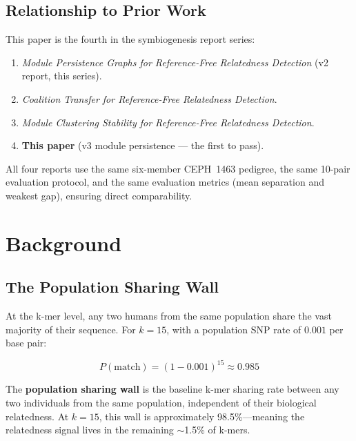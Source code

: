 \documentclass{../yalumba}
\begin{document}
\subsection{Relationship to Prior Work}

This paper is the fourth in the symbiogenesis report series:

\begin{enumerate}
  \item \emph{Module Persistence Graphs for Reference-Free Relatedness
        Detection} (v2 report, this series).
  \item \emph{Coalition Transfer for Reference-Free Relatedness Detection}.
  \item \emph{Module Clustering Stability for Reference-Free Relatedness
        Detection}.
  \item \textbf{This paper} (v3 module persistence --- the first to pass).
\end{enumerate}

\noindent All four reports use the same six-member CEPH~1463 pedigree, the
same 10-pair evaluation protocol, and the same evaluation metrics (mean
separation and weakest gap), ensuring direct comparability.


\section{Background}
\label{sec:background}

\subsection{The Population Sharing Wall}

At the k-mer level, any two humans from the same population share the vast
majority of their sequence.  For $k = 15$, with a population SNP rate of
$0.001$ per base pair:

\begin{equation}
  P(\text{match}) = (1 - 0.001)^{15} \approx 0.985
  \label{eq:sharing-wall}
\end{equation}

\begin{definition}
The \textbf{population sharing wall} is the baseline k-mer sharing rate between
any two individuals from the same population, independent of their biological
relatedness.  At $k = 15$, this wall is approximately 98.5\%---meaning the
relatedness signal lives in the remaining $\sim$1.5\% of k-mers.
\end{definition}
\end{document}
